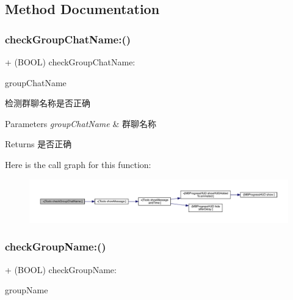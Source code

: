 \subsection{Method Documentation}
\mbox{\label{interface_tools_a15f46d611b1759ae536ea183050b7f42}} 
\subsubsection{\texorpdfstring{check\+Group\+Chat\+Name\+:()}{checkGroupChatName:()}}
{\footnotesize\ttfamily + (B\+O\+OL) check\+Group\+Chat\+Name\+: \begin{DoxyParamCaption}\item[{(N\+S\+String$\ast$)}]{group\+Chat\+Name }\end{DoxyParamCaption}}

检测群聊名称是否正确


\begin{DoxyParams}{Parameters}
{\em group\+Chat\+Name} & 群聊名称\\
\hline
\end{DoxyParams}
\begin{DoxyReturn}{Returns}
是否正确 
\end{DoxyReturn}
Here is the call graph for this function\+:\nopagebreak
\begin{figure}[H]
\begin{center}
\leavevmode
\includegraphics[width=350pt]{interface_tools_a15f46d611b1759ae536ea183050b7f42_cgraph}
\end{center}
\end{figure}
\mbox{\label{interface_tools_a72ce36fa142481b701d46cee384d719e}} 
\subsubsection{\texorpdfstring{check\+Group\+Name\+:()}{checkGroupName:()}}
{\footnotesize\ttfamily + (B\+O\+OL) check\+Group\+Name\+: \begin{DoxyParamCaption}\item[{(N\+S\+String$\ast$)}]{group\+Name }\end{DoxyParamCaption}}

